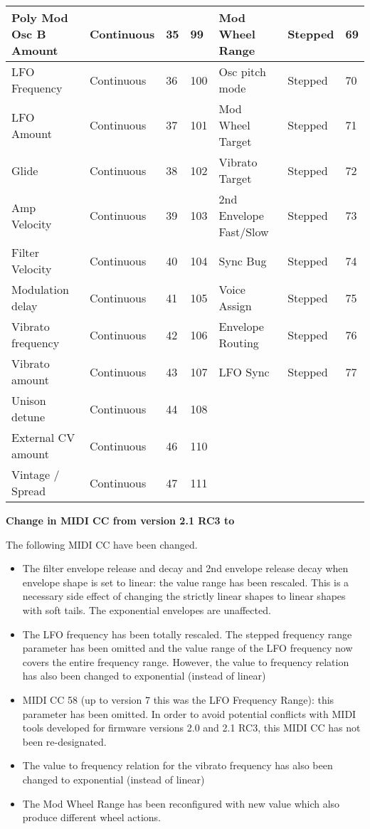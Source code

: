 \begin{longtable}[l]{ p{5cm}|p{2cm}|p{1.5cm}|p{1.5cm}|p{5cm}|p{2cm}|p{1cm}}
Poly Mod Osc B Amount  &  Continuous  & 35 & 99 &  Mod Wheel Range  &  Stepped  &  69 \\ \hline
LFO Frequency  &  Continuous  & 36 & 100 &  Osc pitch mode  &  Stepped  &  70 \\ \hline
LFO Amount  &  Continuous  & 37 & 101 &  Mod Wheel Target  &  Stepped  &  71 \\ \hline
Glide  &  Continuous  & 38 & 102 &  Vibrato Target  &  Stepped  &  72 \\ \hline
Amp Velocity  &  Continuous  & 39 & 103 &   2nd Envelope Fast/Slow  &  Stepped  &  73 \\ \hline
Filter Velocity  &  Continuous  & 40 & 104 &  Sync Bug  &  Stepped  &  74 \\ \hline
Modulation delay  &  Continuous  & 41 & 105 &  Voice Assign  &  Stepped  &  75 \\ \hline
Vibrato frequency  &  Continuous  & 42 & 106 &  Envelope Routing  &  Stepped  &  76 \\ \hline
Vibrato amount  &  Continuous  & 43 & 107 &  LFO Sync  &  Stepped  &  77 \\ \hline
Unison detune  &  Continuous  & 44 & 108 &    &    &   \\ \hline
External CV amount  &  Continuous  & 46 & 110 &  &  &   \\ \hline 
Vintage / Spread  &  Continuous  & 47 & 111 &  &  &   \\ \hline 
 
\end{longtable}

\textbf{Change in MIDI CC from version 2.1 RC3 to \version}

The following MIDI CC have been changed.

\begin{itemize}
  \item The filter envelope release and decay and 2nd envelope release decay when envelope shape is set to linear: the value range has been rescaled. This is a necessary side effect of changing the strictly linear shapes to linear shapes with soft tails. The exponential envelopes are unaffected.
  \item The LFO frequency has been totally rescaled. The stepped frequency range parameter has been omitted and the value range of  the LFO frequency now covers the entire frequency range. However, the value to frequency relation has also been changed to exponential (instead of linear)
  \item MIDI CC 58 (up to version 7 this was the LFO Frequency Range): this parameter has been omitted. In order to avoid potential conflicts with MIDI tools developed for firmware versions 2.0 and 2.1 RC3, this MIDI CC has not been re-designated.
  \item The value to frequency relation for the vibrato frequency has also been changed to exponential (instead of linear)   
  \item The Mod Wheel Range has been reconfigured with new value which also produce different wheel actions.
\end{itemize}

